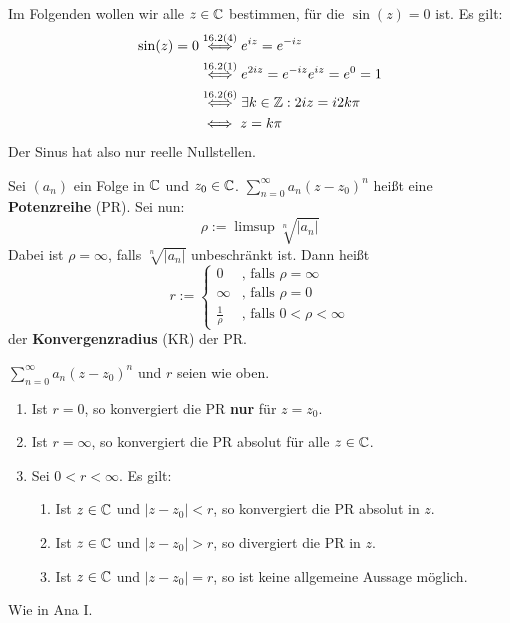 \documentclass[a4paper,oneside,DIV15,BCOR12mm,chapterprefix=true,headings=onelinechapter]{scrbook}
\begin{document}
\begin{beispiel}
Im Folgenden wollen wir alle $z\in\mathbb{C}$ bestimmen, für die $\sin(z)=0$ ist. Es gilt:
\begin{align*}
\sin(z)=0 &\stackrel{16.2(4)}{\iff}e^{iz}=e^{-iz}\\
&\stackrel{16.2(1)}{\iff}e^{2iz}=e^{-iz}e^{iz}=e^0=1\\
&\stackrel{16.2(6)}{\iff}\exists k\in\mathbb{Z}: 2iz=i2k\pi\\
&\iff z=k\pi
\end{align*}
Der Sinus hat also nur reelle Nullstellen.
\end{beispiel}

\begin{definition}
Sei $(a_n)$ ein Folge in $\mathbb{C}$ und $z_0\in\mathbb{C}$. $\sum_{n=0}^\infty a_n(z-z_0)^n$
heißt eine \textbf{Potenzreihe} (PR). Sei nun:
\[\rho:=\limsup \sqrt[n]{|a_n|}\]
Dabei ist $\rho=\infty$, falls $\sqrt[n]{|a_n|}$ unbeschränkt ist. Dann heißt
\[r:=
\begin{cases}
0&\text{, falls }\rho=\infty\\
\infty&\text{, falls }\rho=0\\
\frac1\rho&\text{, falls }0<\rho<\infty
\end{cases}\]
der \textbf{Konvergenzradius} (KR) der PR.
\end{definition}

\begin{satz}
$\sum_{n=0}^\infty a_n(z-z_0)^n$ und $r$ seien wie oben.
\begin{enumerate}
\item Ist $r=0$, so konvergiert die PR \textbf{nur} für $z=z_0$.
\item Ist $r=\infty$, so konvergiert die PR absolut für alle $z\in\mathbb{C}$.
\item Sei $0<r<\infty$. Es gilt:
\begin{enumerate}
\item Ist $z\in\mathbb{C}$ und $|z-z_0|<r$, so konvergiert die PR absolut in $z$.
\item Ist $z\in\mathbb{C}$ und $|z-z_0|>r$, so divergiert die PR in $z$.
\item Ist $z\in\mathbb{C}$ und $|z-z_0|=r$, so ist keine allgemeine Aussage möglich.
\end{enumerate}
\end{enumerate}
\end{satz}

\begin{beweis}
Wie in Ana I.
\end{beweis}
\end{document}
